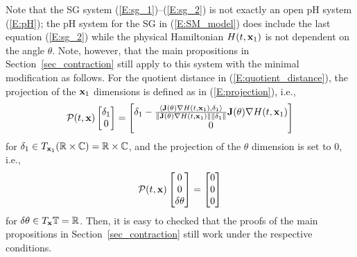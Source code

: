 Note that the SG system (\ref{E:sg_1})--(\ref{E:sg_2}) is not exactly an open pH system (\ref{E:pH}); the pH system for the SG in (\ref{E:SM_model}) does include the last equation (\ref{E:sg_2}) while the physical Hamiltonian $H(t, \mathbf{x}_1)$ is not dependent on the angle $\theta$. Note, however, that the main propositions in Section~\ref{sec_contraction} still apply to this system with the minimal modification as follows. For the quotient distance in (\ref{E:quotient_distance}), the projection of the $\mathbf{x}_1$ dimensions is defined as in (\ref{E:projection}), i.e.,
\begin{equation*}
    \mathcal P(t, \mathbf{x}) \begin{bmatrix}
        \delta_1 \\
        0
    \end{bmatrix} = \begin{bmatrix} 
        \delta_1 - \frac{\langle \mathbf{J}(\theta) \nabla H(t, \mathbf{x}_1), \delta_1 \rangle}{\| \mathbf{J}(\theta) \nabla H(t, \mathbf{x}_1)\| \|\delta_1\|} \mathbf{J}(\theta) \nabla H(t, \mathbf{x}_1) \\
        0
    \end{bmatrix}
\end{equation*}
for $\delta_1 \in T_{\mathbf{x}_1} (\mathbb{R} \times \mathbb{C}) = \mathbb{R} \times \mathbb{C}$, and the projection of the $\theta$ dimension is set to $0$, i.e.,
\begin{equation*}
    \mathcal P(t, \mathbf{x}) \begin{bmatrix}
        0 \\
        0 \\
        \delta \theta
    \end{bmatrix} = \begin{bmatrix}
        0 \\
        0 \\
        0
    \end{bmatrix}
\end{equation*}
for $\delta \theta \in T_{\mathbf{x}} \mathbb{T} = \mathbb{R}$.
Then, it is easy to checked that the proofs of the main propositions in Section~\ref{sec_contraction} still work under the respective conditions.

